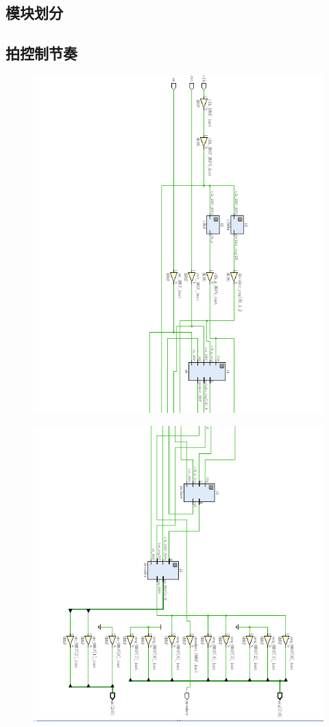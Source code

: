 \documentclass[UTF8]{ctexart}
\begin{document}
\subsection{模块划分}
\subsection{拍控制节奏}
\begin{figure}[p]
  \centering
  \includegraphics[width=1\textwidth]{m1.png}
\end{figure}
\begin{figure}[p]
  \centering
  \includegraphics[width=1\textwidth]{m2.png}
\end{figure}
\end{document}
